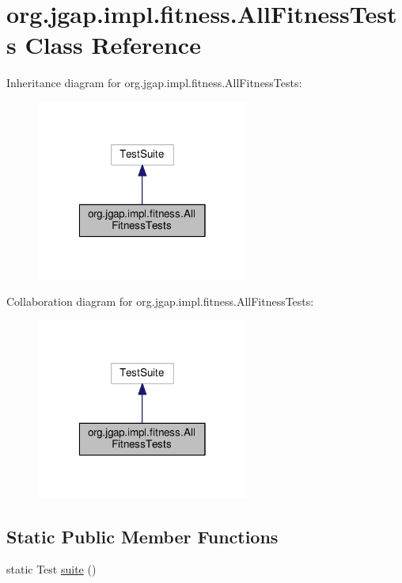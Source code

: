 \hypertarget{classorg_1_1jgap_1_1impl_1_1fitness_1_1_all_fitness_tests}{\section{org.\-jgap.\-impl.\-fitness.\-All\-Fitness\-Tests Class Reference}
\label{classorg_1_1jgap_1_1impl_1_1fitness_1_1_all_fitness_tests}
}


Inheritance diagram for org.\-jgap.\-impl.\-fitness.\-All\-Fitness\-Tests\-:
\nopagebreak
\begin{figure}[H]
\begin{center}
\leavevmode
\includegraphics[width=198pt]{classorg_1_1jgap_1_1impl_1_1fitness_1_1_all_fitness_tests__inherit__graph}
\end{center}
\end{figure}


Collaboration diagram for org.\-jgap.\-impl.\-fitness.\-All\-Fitness\-Tests\-:
\nopagebreak
\begin{figure}[H]
\begin{center}
\leavevmode
\includegraphics[width=198pt]{classorg_1_1jgap_1_1impl_1_1fitness_1_1_all_fitness_tests__coll__graph}
\end{center}
\end{figure}
\subsection*{Static Public Member Functions}
\begin{DoxyCompactItemize}
\item 
static Test \hyperlink{classorg_1_1jgap_1_1impl_1_1fitness_1_1_all_fitness_tests_aaddbd335bd807793d25241ea64339b2a}{suite} ()
\end{DoxyCompactItemize}
